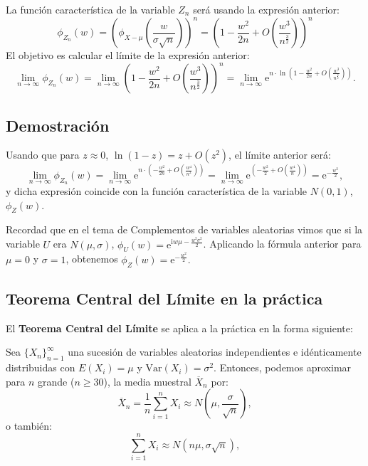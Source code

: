 \documentclass[]{book}
\begin{document}
La función característica de la variable \(Z_n\) será usando la expresión anterior:
\[
\phi_{Z_n}(w)=\left(\phi_{X-\mu}\left(\frac{w}{\sigma\sqrt{n}}\right)\right)^n = \left(1-\frac{w^2}{2n}+O\left(\frac{w^3}{n^{\frac{3}{2}}}\right)\right)^n
\]
El objetivo es calcular el límite de la expresión anterior:
\[
\lim_{n\to \infty}\phi_{Z_n}(w) = \lim_{n\to\infty} \left(1-\frac{w^2}{2n}+O\left(\frac{w^3}{n^{\frac{3}{2}}}\right)\right)^n = 
\lim_{n\to \infty}\mathrm{e}^{n\cdot \ln \left(1-\frac{w^2}{2n}+O\left(\frac{w^3}{n^{\frac{3}{2}}}\right)\right)}.
\]

\hypertarget{demostraciuxf3n-10}{%
\subsection{Demostración}\label{demostraciuxf3n-10}}

Usando que para \(z\approx 0\), \(\ln(1-z)=z+O(z^2)\), el límite anterior será:
\[
\lim_{n\to \infty}\phi_{Z_n}(w) = 
\lim_{n\to \infty}\mathrm{e}^{n\cdot \left(-\frac{w^2}{2n}+O\left(\frac{w^4}{n^{2}}\right)\right)} = \lim_{n\to \infty}\mathrm{e}^{ \left(-\frac{w^2}{2}+O\left(\frac{w^4}{n}\right)\right)} = \mathrm{e}^{-\frac{w^2}{2}},
\]
y dicha expresión coincide con la función característica de la variable \(N(0,1)\), \(\phi_{Z}(w)\).

Recordad que en el tema de Complementos de variables aleatorias vimos que si la variable \(U\) era \(N(\mu,\sigma)\), \(\phi_{U}(w)=\mathrm{e}^{\mathrm{i}w\mu-\frac{w^2\sigma^2}{2}}\). Aplicando la fórmula anterior para \(\mu=0\) y \(\sigma=1\), obtenemos \(\phi_{Z}(w)=\mathrm{e}^{-\frac{w^2}{2}}.\)

\hypertarget{teorema-central-del-luxedmite-en-la-pruxe1ctica}{%
\subsection{Teorema Central del Límite en la práctica}\label{teorema-central-del-luxedmite-en-la-pruxe1ctica}}

El \textbf{Teorema Central del Límite} se aplica a la práctica en la forma siguiente:

Sea \(\{X_n\}_{n=1}^\infty\) una sucesión de variables aleatorias independientes e idénticamente distribuidas con \(E(X_i)=\mu\) y \(\mathrm{Var}(X_i)=\sigma^2\). Entonces, podemos aproximar para \(n\) grande (\(n\geq 30\)), la media muestral \(\overline{X}_n\) por:
\[
\overline{X}_n =\frac{1}{n}\sum_{i=1}^n X_i \approx N\left(\mu,\frac{\sigma}{\sqrt{n}}\right),
\]
o también:
\[
\sum_{i=1}^n X_i \approx N\left(n\mu,\sigma\sqrt{n}\right),
\]
\end{document}

